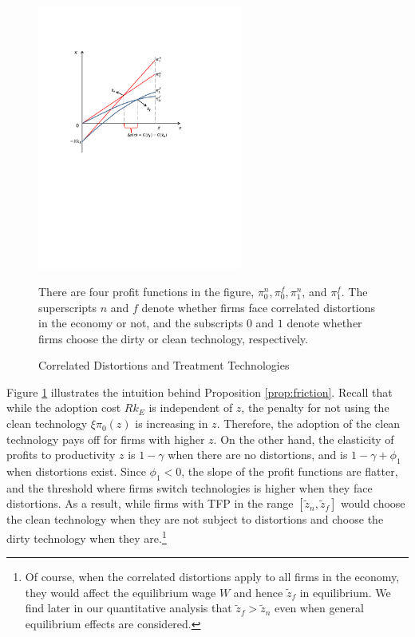 \documentclass[AEJ]{AEA}
\begin{document}
\begin{figure}[t]
\begin{center}
    \includegraphics[width=0.60\textwidth]{./Figures/prod_tax_effect.pdf}
    \caption{Correlated Distortions and Treatment Technologies}
    \label{fig:constantp}
    \begin{figurenotes}
        There are four profit functions in the figure, $\pi_0^n, \pi_0^f, \pi_1^n$, and $\pi_1^f$. The superscripts $n$ and $f$ denote whether firms face correlated distortions in the economy or not, and the subscripts $0$ and $1$ denote whether firms choose the dirty or clean technology, respectively.
    \end{figurenotes}
\end{center}
\end{figure}
\noindent Figure \ref{fig:constantp} illustrates the intuition behind Proposition \ref{prop:friction}. Recall that while the adoption cost $Rk_E$ is independent of $z$, the penalty for not using the clean technology $\xi \pi_0(z)$ is increasing in $z$. Therefore, the adoption of the clean technology pays off for firms with higher $z$. On the other hand, the elasticity of profits to productivity $z$ is $1-\gamma$ when there are no distortions, and is $1-\gamma+\phi_1$ when distortions exist. Since $\phi_1 < 0$, the slope of the profit functions are flatter, and the threshold where firms switch technologies is higher when they face distortions. As a result, while firms with TFP in the range $[\tilde{z}_n, \tilde{z}_f]$ would choose the clean technology when they are not subject to distortions and choose the dirty technology when they are.\footnote{Of course, when the correlated distortions apply to all firms in the economy, they would affect the equilibrium wage $W$ and hence $\tilde{z}_f$ in equilibrium. We find later in our quantitative analysis that $\tilde{z}_f > \tilde{z}_n$ even when general equilibrium effects are considered.}
\end{document}
